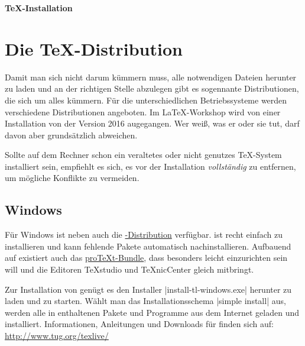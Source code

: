 \documentclass[
	ausgabe=2016-11-24,
	titel=Installationshinweise,
	shortverb=true,
]{../tex/latexkurs-exercise}
\begin{document}
\begin{center}
\sffamily\bfseries\Large \TeX-Installation
\end{center}
\begin{abstract}
\noindent
Diese Anleitung erklärt ganz grundlegend, wie man eine aktuelle \TeXlive-\linebreak Distribution Installiert, die für den \LaTeX-Kurs vorausgesetzt wird.
Ein funktionierendes \TeX-System besteht im Grundsatz aus zwei Teilen: einer \TeX-Distribution und einem 
Editor.
\end{abstract}

\section{Die \TeX-Distribution}
Damit man sich nicht darum kümmern muss, alle notwendigen Dateien herunter zu laden und an der richtigen Stelle abzulegen gibt es sogennante Distributionen, die sich um alles kümmern. Für die unterschiedlichen Betriebssysteme werden verschiedene Distributionen angeboten. Im \LaTeX-Workshop wird von einer Installation von \href{http://www.tug.org/texlive/}{\TeXlive} der Version 2016 augegangen. Wer weiß, was er oder sie tut, darf davon aber grundsätzlich abweichen.

Sollte auf dem Rechner schon ein veraltetes oder nicht genutzes \TeX-System installiert sein, empfiehlt es sich, es vor der Installation \emph{vollständig} zu entfernen, um mögliche Konflikte zu vermeiden.

\subsection*{Windows}
Für Windows ist neben \href{http://www.tug.org/texlive/}{\TeXlive} auch die \href{http://www.miktex.org/}{\MikTeX-Distribution} verfügbar. \MikTeX ist recht einfach zu installieren und kann fehlende Pakete automatisch nachinstallieren. Aufbauend auf \MikTeX existiert auch das \href{http://www.tug.org/protext/}{pro\TeX t-Bundle}, dass besonders leicht einzurichten sein will und die Editoren \TeX studio und \TeX nicCenter gleich mitbringt.

Zur Installation von \TeXlive genügt es den Installer |install-tl-windows.exe| herunter zu laden und zu starten. Wählt man das Installationsschema |simple install| aus, werden alle in \TeXlive enthaltenen Pakete und Programme aus dem Internet geladen und installiert. Informationen, Anleitungen und Downloads für \TeXlive finden sich auf:\\ \url{http://www.tug.org/texlive/}
\end{document}
